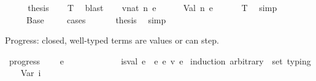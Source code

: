 \begin{isabellebody}
\ \ \isamarkupfalse%
\ \isamarkupfalse%
\ {\isacharquery}{\kern0pt}thesis\isanewline
\ \ \isamarkupfalse%
\ T\ \isamarkupfalse%
\ blast\isanewline
{}\isamarkupfalse%
\isanewline
\ \ \isamarkupfalse%
\ {\isacharparenleft}{\kern0pt}v{\isacharunderscore}{\kern0pt}nat\ n\ e{\isacharparenright}{\kern0pt}\isanewline
\ \ \isamarkupfalse%
\ {\isachardoublequoteopen}{\isacharbrackleft}{\kern0pt}{\isacharbrackright}{\kern0pt}\ {\isasymturnstile}\ Val\ n\ e\ {\isacharcolon}{\kern0pt}\ {\isasymtau}{}\ {\isasymRightarrow}\ {\isasymtau}{}{\isachardoublequoteclose}\ \isamarkupfalse%
\ T\ \isamarkupfalse%
\ simp\isanewline
\ \ \isamarkupfalse%
\ \isamarkupfalse%
\ {\isachardoublequoteopen}{\isasymtau}\ {\isasymRightarrow}\ {\isasymtau}{}\ {\isacharequal}{\kern0pt}\ Base\ {}{\isachardoublequoteclose}\isanewline
\ \ \isamarkupfalse%
\ cases\isanewline
\ \ \isamarkupfalse%
\isanewline
\ \ \isamarkupfalse%
\ {\isacharquery}{\kern0pt}thesis\ \isamarkupfalse%
\ simp\isanewline
{}\isamarkupfalse%
%
\endisatagproof
{\isafoldproof}%
%
\isadelimproof
%
\endisadelimproof
%
\begin{isamarkuptext}%
Progress: closed, well-typed terms are values or can step.%
\end{isamarkuptext}\isamarkuptrue%
\isamarkupfalse%
\ progress{\isacharcolon}{\kern0pt}\isanewline
\ \ {\isachardoublequoteopen}{\isasymGamma}\ {\isasymturnstile}\ e\ {\isacharcolon}{\kern0pt}\ {\isasymtau}\ {\isasymLongrightarrow}\isanewline
\ \ \ {\isasymGamma}\ {\isacharequal}{\kern0pt}\ {\isacharbrackleft}{\kern0pt}{\isacharbrackright}{\kern0pt}\ {\isasymLongrightarrow}\isanewline
\ \ \ is{\isacharunderscore}{\kern0pt}val\ e\ {\isasymor}\ {\isacharparenleft}{\kern0pt}{\isasymexists}e{\isacharprime}{\kern0pt}{\isachardot}{\kern0pt}\ e\ {\isasymrightarrow}\isactrlsub v\ e{\isacharprime}{\kern0pt}{\isacharparenright}{\kern0pt}{\isachardoublequoteclose}\isanewline
%
\isadelimproof
%
\endisadelimproof
%
\isatagproof
{}\isamarkupfalse%
\ {\isacharparenleft}{\kern0pt}induction\ arbitrary{\isacharcolon}{\kern0pt}\ {\isasymtau}\ set{\isacharcolon}{\kern0pt}\ typing{\isacharparenright}{\kern0pt}\isanewline
\ \ \isamarkupfalse%
\ {\isacharparenleft}{\kern0pt}Var\ i\ {\isasymGamma}{\isacharprime}{\kern0pt}\ {\isasymtau}{\isacharparenright}{\kern0pt}\isanewline

\end{isabellebody}
